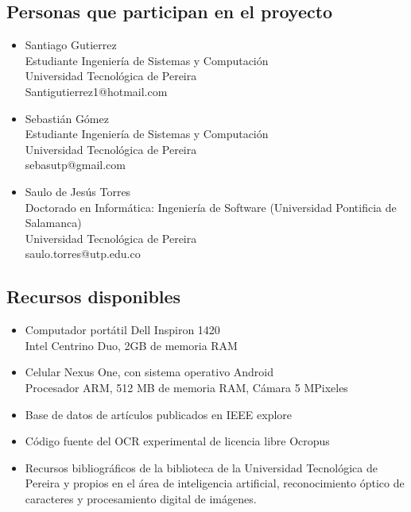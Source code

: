 \documentclass[a4paper, 11pt, oneside]{article}
\begin{document}
	\clearpage
	
	\begin{center}
	\section{Personas que participan en el proyecto}
	\end{center}
	\begin{itemize}
   \item Santiago Gutierrez\\
Estudiante Ingeniería de Sistemas y Computación\\
Universidad Tecnológica de Pereira\\
Santigutierrez1@hotmail.com
   \item Sebastián Gómez\\
Estudiante Ingeniería de Sistemas y Computación\\
Universidad Tecnológica de Pereira\\
sebasutp@gmail.com
   \item Saulo de Jesús Torres\\
Doctorado en Informática: Ingeniería de Software (Universidad Pontificia de Salamanca)\\
Universidad Tecnológica de Pereira\\
saulo.torres@utp.edu.co
	\end{itemize}
	\clearpage
	
	\begin{center}
	\section{Recursos disponibles}
	\end{center}
	\begin{itemize}
		\item Computador portátil Dell Inspiron 1420\\
			Intel Centrino Duo, 2GB de memoria RAM
		\item Celular Nexus One, con sistema operativo Android\\
			Procesador ARM, 512 MB de memoria RAM, Cámara 5 MPixeles
		\item Base de datos de artículos publicados en IEEE explore
		\item Código fuente del OCR experimental de licencia libre Ocropus
	    \item Recursos bibliográficos de la biblioteca de la Universidad Tecnológica de Pereira y propios en el área de inteligencia artificial, reconocimiento óptico de caracteres y procesamiento digital de imágenes.
	\end{itemize}
	
\end{document}
